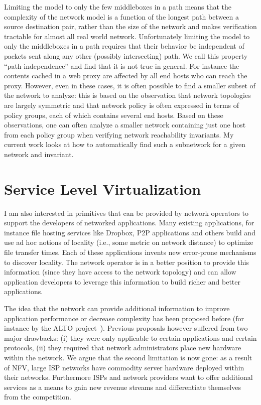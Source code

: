 \documentclass[letterpaper]{article}
\begin{document}
\begin{itemize}
Limiting the model to only the few middleboxes in a path means that the complexity of the network model is a function of
the longest path between a source destination pair, rather than the size of the network and makes verification tractable
for almost all real world network. Unfortunately limiting the model to only the middleboxes in a path requires that
their behavior be independent of packets sent along any other (possibly intersecting) path. We call this property ``path
independence'' and find that it is not true in general. For instance the contents cached in a web proxy are affected by
all end hosts who can reach the proxy. However, even in these cases, it is often possible to find a smaller subset of
the network to analyze: this is based on the observation that network topologies are largely symmetric and that 
network policy is often expressed in terms of policy groups, each of which contains several end hosts. Based on these
observations, one can often analyze a smaller network containing just one host from each policy group when verifying
network reachability invariants. My current work looks at how to automatically find such a subnetwork for a given
network and invariant.

\end{itemize}

\section*{Service Level Virtualization}
I am also interested in primitives that can be provided by network operators to support the developers of
networked applications. Many existing applications, for instance file hosting services like Dropbox, P2P
applications and others build and use ad hoc notions of locality (i.e., some metric on network distance) to optimize
file transfer times. Each of these applications invents new error-prone mechanisms to discover locality. The network
operator is in a better position to provide this information (since they have access to the network topology) and can
allow application developers to leverage this information to build richer and better applications.

The idea that the network can provide additional information to improve application performance or decrease complexity
has been proposed before (for instance by the ALTO project~\cite{seedorf2009traffic}). Previous proposals however
suffered from two major drawbacks: (i) they were only applicable to certain applications and certain protocols, (ii) they
required that network administrators place new hardware within the network. We argue that the second limitation is now
gone: as a result of NFV, large ISP networks have commodity server hardware deployed within
their networks. Furthermore ISPs and network providers want to offer additional services as a means to gain new revenue
streams and differentiate themselves from the competition.
\end{document}
